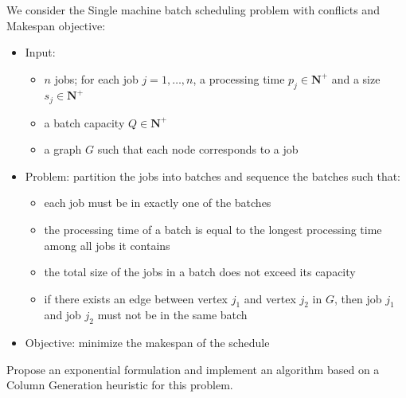 \documentclass[a4paper]{article}
\newcommand{\N}{\mathbf{N}}
\begin{document}
We consider the Single machine batch scheduling problem with conflicts and Makespan objective:
\begin{itemize}
  \item Input:
    \begin{itemize}
      \item $n$ jobs; for each job $j = 1, \dots, n$, a processing time $p_j \in \N^+$ and a size $s_j \in \N^+$
      \item a batch capacity $Q \in \N^+$
      \item a graph $G$ such that each node corresponds to a job
    \end{itemize}
  \item Problem: partition the jobs into batches and sequence the batches such that:
    \begin{itemize}
      \item each job must be in exactly one of the batches
      \item the processing time of a batch is equal to the longest processing time among all jobs it contains
      \item the total size of the jobs in a batch does not exceed its capacity
      \item if there exists an edge between vertex $j_1$ and vertex $j_2$ in $G$, then job $j_1$ and job $j_2$ must not be in the same batch
    \end{itemize}
  \item Objective: minimize the makespan of the schedule
\end{itemize}

Propose an exponential formulation and implement an algorithm based on a Column Generation heuristic for this problem.
\end{document}
